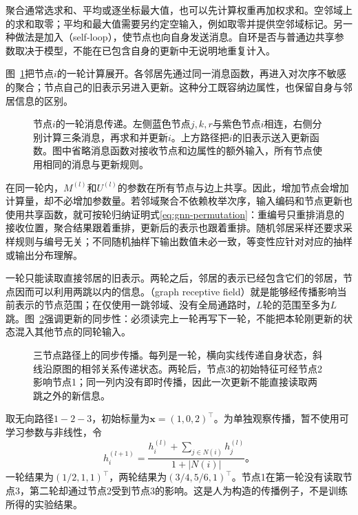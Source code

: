 聚合通常选求和、平均或逐坐标最大值，也可以先计算权重再加权求和。空邻域上的求和取零；平均和最大值需要另约定空输入，例如取零并提供空邻域标记。另一种做法是加入（self-loop），使节点也向自身发送消息。自环是否与普通边共享参数取决于模型，不能在已包含自身的更新中无说明地重复计入。

图~\ref{fig:gnn-message-passing}把节点$i$的一轮计算展开。各邻居先通过同一消息函数，再进入对次序不敏感的聚合；节点自己的旧表示另进入更新。这种分工既容纳边属性，也保留自身与邻居信息的区别。
\begin{figure}[htb]
  \centering
  
  \caption{节点$i$的一轮消息传递。左侧蓝色节点$j,k,r$与紫色节点$i$相连，右侧分别计算三条消息，再求和并更新$i$。上方路径把$i$的旧表示送入更新函数。图中省略消息函数对接收节点和边属性的额外输入，所有节点使用相同的消息与更新规则。}
  \label{fig:gnn-message-passing}
\end{figure}

在同一轮内，$M^{(l)}$和$U^{(l)}$的参数在所有节点与边上共享。因此，增加节点会增加计算量，却不必增加参数量。若邻域聚合不依赖枚举次序，输入编码和节点更新也使用共享函数，就可按轮归纳证明式\eqref{eq:gnn-permutation}：重编号只重排消息的接收位置，聚合结果跟着重排，更新后的表示也跟着重排。随机邻居采样还要求采样规则与编号无关；不同随机抽样下输出数值未必一致，等变性应针对对应的抽样或输出分布理解。

一轮只能读取直接邻居的旧表示。两轮之后，邻居的表示已经包含它们的邻居，节点因而可以利用两跳以内的信息。（graph receptive field）就是能够经传播影响当前表示的节点范围；在仅使用一跳邻域、没有全局通路时，$L$轮的范围至多为$L$跳。图~\ref{fig:gnn-propagation}强调更新的同步性：必须读完上一轮再写下一轮，不能把本轮刚更新的状态混入其他节点的同轮输入。

\begin{figure}[htb]
  \centering
  
  \caption{三节点路径上的同步传播。每列是一轮，横向实线传递自身状态，斜线沿原图的相邻关系传递状态。两轮后，节点3的初始特征可经节点2影响节点1；同一列内没有即时传播，因此一次更新不能直接读取两跳之外的新信息。}
  \label{fig:gnn-propagation}
\end{figure}

\begin{example}[两轮邻域平均]
\label{ex:gnn-two-rounds}
取无向路径$1-2-3$，初始标量为$\bm{x}=(1,0,2)^{\top}$。为单独观察传播，暂不使用可学习参数与非线性，令
\[
  h_i^{(l+1)}=\frac{h_i^{(l)}+\sum_{j\in N(i)}h_j^{(l)}}{1+|N(i)|}\text{。}
\]
一轮结果为$(1/2,1,1)^{\top}$，两轮结果为$(3/4,5/6,1)^{\top}$。节点1在第一轮没有读取节点3，第二轮却通过节点2受到节点3的影响。这是人为构造的传播例子，不是训练所得的实验结果。
\end{example}

